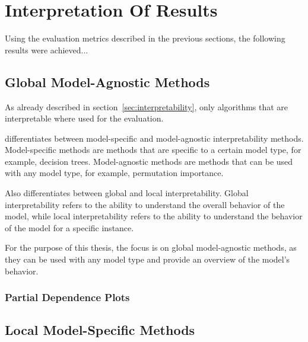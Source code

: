 \section{Interpretation Of Results}
Using the evaluation metrics described in the previous sections, the following results were
achieved...

\subsection*{Global Model-Agnostic Methods}
As already described in section~\ref{sec:interpretability}, only algorithms that are
interpretable where used for the evaluation.

\cite{molnar2020interpretable} differentiates between
model-specific and model-agnostic interpretability methods.
Model-specific methods are methods that are specific to a certain model type, for example,
decision trees.
Model-agnostic methods are methods that can be used with any model type, for
example, permutation importance.

Also \cite{molnar2020interpretable} differentiates between global and local interpretability. Global
interpretability refers to the ability to understand the overall behavior of the model, while
local interpretability refers to the ability to understand the behavior of the model for a
specific instance.

For the purpose of this thesis, the focus is on global model-agnostic methods, as they can be used
with any model type and provide an overview of the model's behavior.

\subsubsection*{Partial Dependence Plots}

\subsection{Local Model-Specific Methods}\label{subsec:local-model-specific-methods}








